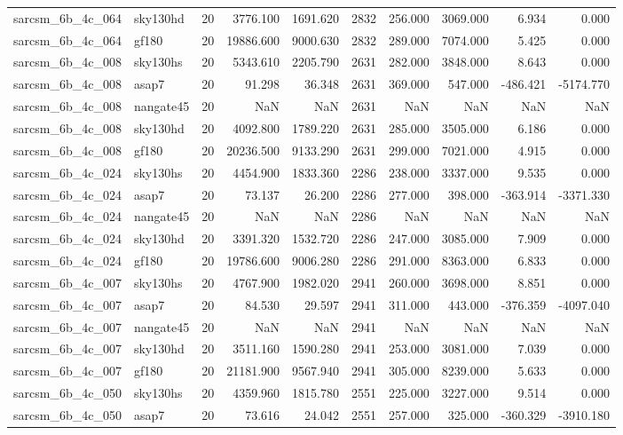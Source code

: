 \begin{tabular}{llrrrrrrrr}
sarcsm\_6b\_4c\_064 & sky130hd & 20 & 3776.100 & 1691.620 & 2832 & 256.000 & 3069.000 & 6.934 & 0.000 \\
sarcsm\_6b\_4c\_064 & gf180 & 20 & 19886.600 & 9000.630 & 2832 & 289.000 & 7074.000 & 5.425 & 0.000 \\
sarcsm\_6b\_4c\_008 & sky130hs & 20 & 5343.610 & 2205.790 & 2631 & 282.000 & 3848.000 & 8.643 & 0.000 \\
sarcsm\_6b\_4c\_008 & asap7 & 20 & 91.298 & 36.348 & 2631 & 369.000 & 547.000 & -486.421 & -5174.770 \\
sarcsm\_6b\_4c\_008 & nangate45 & 20 & NaN & NaN & 2631 & NaN & NaN & NaN & NaN \\
sarcsm\_6b\_4c\_008 & sky130hd & 20 & 4092.800 & 1789.220 & 2631 & 285.000 & 3505.000 & 6.186 & 0.000 \\
sarcsm\_6b\_4c\_008 & gf180 & 20 & 20236.500 & 9133.290 & 2631 & 299.000 & 7021.000 & 4.915 & 0.000 \\
sarcsm\_6b\_4c\_024 & sky130hs & 20 & 4454.900 & 1833.360 & 2286 & 238.000 & 3337.000 & 9.535 & 0.000 \\
sarcsm\_6b\_4c\_024 & asap7 & 20 & 73.137 & 26.200 & 2286 & 277.000 & 398.000 & -363.914 & -3371.330 \\
sarcsm\_6b\_4c\_024 & nangate45 & 20 & NaN & NaN & 2286 & NaN & NaN & NaN & NaN \\
sarcsm\_6b\_4c\_024 & sky130hd & 20 & 3391.320 & 1532.720 & 2286 & 247.000 & 3085.000 & 7.909 & 0.000 \\
sarcsm\_6b\_4c\_024 & gf180 & 20 & 19786.600 & 9006.280 & 2286 & 291.000 & 8363.000 & 6.833 & 0.000 \\
sarcsm\_6b\_4c\_007 & sky130hs & 20 & 4767.900 & 1982.020 & 2941 & 260.000 & 3698.000 & 8.851 & 0.000 \\
sarcsm\_6b\_4c\_007 & asap7 & 20 & 84.530 & 29.597 & 2941 & 311.000 & 443.000 & -376.359 & -4097.040 \\
sarcsm\_6b\_4c\_007 & nangate45 & 20 & NaN & NaN & 2941 & NaN & NaN & NaN & NaN \\
sarcsm\_6b\_4c\_007 & sky130hd & 20 & 3511.160 & 1590.280 & 2941 & 253.000 & 3081.000 & 7.039 & 0.000 \\
sarcsm\_6b\_4c\_007 & gf180 & 20 & 21181.900 & 9567.940 & 2941 & 305.000 & 8239.000 & 5.633 & 0.000 \\
sarcsm\_6b\_4c\_050 & sky130hs & 20 & 4359.960 & 1815.780 & 2551 & 225.000 & 3227.000 & 9.514 & 0.000 \\
sarcsm\_6b\_4c\_050 & asap7 & 20 & 73.616 & 24.042 & 2551 & 257.000 & 325.000 & -360.329 & -3910.180 \\

\end{tabular}
